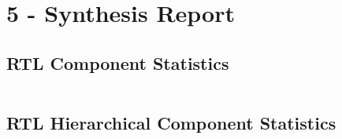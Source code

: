 \documentclass[11pt]{report}
\begin{document}
\newpage
\section*{5 - Synthesis Report}
\subsection*{RTL Component Statistics}
\inputminted[firstline=131,lastline=150]{text}{../../../DE_Project_T1/DE_Project_T1.runs/synth_1/TOP_LEVEL.vds}

\subsection*{RTL Hierarchical Component Statistics}
\inputminted[firstline=157,lastline=207]{text}{../../../DE_Project_T1/DE_Project_T1.runs/synth_1/TOP_LEVEL.vds}
\end{document}
